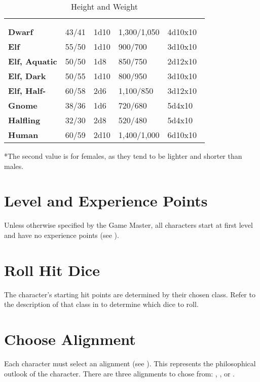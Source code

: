 \begin{multicols*}{2}
\begin {table}[H]
	\caption{Height and Weight}\label{tab:Height and Weight}
  \begin{tabularx}{\columnwidth}{>{\bfseries}YYYYY}
		\thead{} &  & \\
		 &  &  &  & \\
		Dwarf & 43/41 & 1d10 & 1,300/1,050 & 4d10x10\\
		Elf & 55/50 & 1d10 & 900/700 & 3d10x10\\
		Elf, Aquatic & 50/50 & 1d8 & 850/750 & 2d12x10\\
		Elf, Dark & 50/55 & 1d10 & 800/950 & 3d10x10\\
		Elf, Half- & 60/58 & 2d6 & 1,100/850 & 3d12x10\\
		Gnome & 38/36 & 1d6 & 720/680 & 5d4x10\\
		Halfling & 32/30 & 2d8 & 520/480 & 5d4x10\\
		Human & 60/59 & 2d10 & 1,400/1,000 & 6d10x10\
  \end {tabularx}
\begin{flushleft}
	*The second value is for females, as they tend to be lighter and shorter than males.
\end{flushleft}
\end {table}

\section{Level and Experience Points}
Unless otherwise specified by the Game Master, all characters start at first level and have no experience points (see ).

\section{Roll Hit Dice}
The character’s starting hit points are determined by their chosen class. Refer to the description of that class in  to determine which dice to roll.


\section{Choose Alignment}
Each character must select an alignment (see ). This represents the philosophical outlook of the character. There are three alignments to chose from: , , or .


\end{multicols*}
